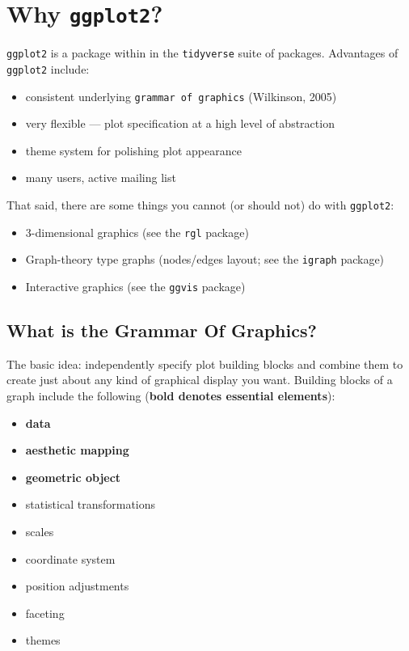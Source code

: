 \documentclass[]{book}
\providecommand{\tightlist}{%
  \setlength{\itemsep}{0pt}\setlength{\parskip}{0pt}}
\begin{document}
\section{\texorpdfstring{Why
\texttt{ggplot2}?}{Why ggplot2?}}\label{why-ggplot2}

\texttt{ggplot2} is a package within in the \texttt{tidyverse} suite of
packages. Advantages of \texttt{ggplot2} include:

\begin{itemize}
\tightlist
\item
  consistent underlying \texttt{grammar\ of\ graphics} (Wilkinson, 2005)
\item
  very flexible --- plot specification at a high level of abstraction
\item
  theme system for polishing plot appearance
\item
  many users, active mailing list
\end{itemize}

That said, there are some things you cannot (or should not) do with
\texttt{ggplot2}:

\begin{itemize}
\tightlist
\item
  3-dimensional graphics (see the \texttt{rgl} package)
\item
  Graph-theory type graphs (nodes/edges layout; see the \texttt{igraph}
  package)
\item
  Interactive graphics (see the \texttt{ggvis} package)
\end{itemize}

\subsection{What is the Grammar Of
Graphics?}\label{what-is-the-grammar-of-graphics}

The basic idea: independently specify plot building blocks and combine
them to create just about any kind of graphical display you want.
Building blocks of a graph include the following (\textbf{bold denotes
essential elements}):

\begin{itemize}
\tightlist
\item
  \textbf{data}
\item
  \textbf{aesthetic mapping}
\item
  \textbf{geometric object}
\item
  statistical transformations
\item
  scales
\item
  coordinate system
\item
  position adjustments
\item
  faceting
\item
  themes
\end{itemize}
\end{document}
